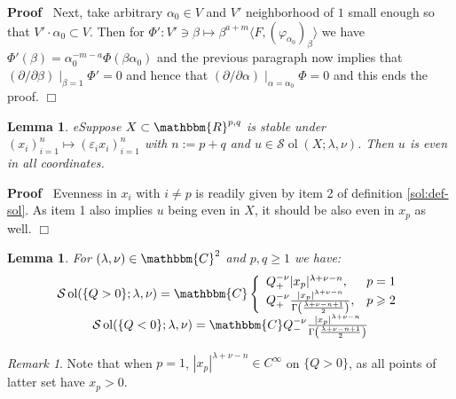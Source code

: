 \documentclass[12pt]{article}
\newcommand{\assign}{:=}
\newcommand{\tmop}[1]{\ensuremath{\operatorname{#1}}}
\renewenvironment{proof}{\noindent\textbf{Proof\ }}{\hspace*{\fill}$\Box$\medskip}
\newtheorem{lemma}[proposition]{Lemma}
\theoremstyle{remark}
\newtheorem{remark}[proposition]{Remark}
\begin{document}
\begin{proof}
  Next, take arbitrary $\alpha_0 \in V$ and $V'$ neighborhood of $1$ small
  enough so that $V' \cdot \alpha_0 \subset V$. Then for $\Phi' : V' \ni \beta
  \mapsto \beta^{a + m} \langle F, (\varphi_{\alpha_0})_{\beta} \rangle$ we
  have $\Phi' (\beta) = \alpha_0^{- m - a} \Phi (\beta \alpha_0)$ and the
  previous paragraph now implies that $(\partial / \partial \beta)
  \mid_{\beta = 1} \Phi' = 0$ and hence that $(\partial / \partial \alpha)
  \mid_{\alpha = \alpha_0} \Phi = 0$ and this ends the proof.
\end{proof}

\begin{lemma}
  \label{lem67:lem-eveninall}eSuppose $X \subset \mathbbm{R}^{p, q}$ is stable
  under $(x_i)_{i = 1}^n \mapsto (\varepsilon_i x_i)_{i = 1}^n$ with $n
  \assign p + q$ and $u \in \mathcal{S} \tmop{ol} (X ; \lambda, \nu)$. Then
  $u$ is even in all coordinates.
\end{lemma}

\begin{proof}
  Evenness in $x_i$ with $i \neq p$ is readily given by item 2 of definition
  \ref{sol:def-sol}. As item 1 also implies $u$ being even in $X$, it should
  be also even in $x_p$ as well.
\end{proof}

\begin{lemma}
  \label{lem67:lem-Qpm}For $(\lambda, \nu) \in \mathbbm{C}^2$ and $p, q
  \geqslant 1$ we have:
  \[ \begin{array}{c}
       \mathcal{S} \tmop{ol} (\{ Q > 0 \} ; \lambda, \nu) =\mathbbm{C} \left\{
       \begin{array}{ll}
         Q_+^{- \nu} | x_p |^{\lambda + \nu - n}, & p = 1\\
         Q_+^{- \nu} \frac{| x_p |^{\lambda + \nu - n}}{\Gamma \left(
         \frac{\lambda + \nu - n + 1}{2} \right)}, & p \geqslant 2
       \end{array} \right.\\
       \mathcal{S} \tmop{ol} (\{ Q < 0 \} ; \lambda, \nu) =\mathbbm{C}Q_-^{-
       \nu} \frac{| x_p |^{\lambda + \nu - n}}{\Gamma \left( \frac{\lambda +
       \nu - n + 1}{2} \right)}
     \end{array} \]
\end{lemma}

\begin{remark}
  Note that when $p = 1$, $| x_p |^{\lambda + \nu - n} \in C^{\infty}$ on $\{
  Q > 0 \}$, as all points of latter set have $x_p > 0$.
\end{remark}
\end{document}
